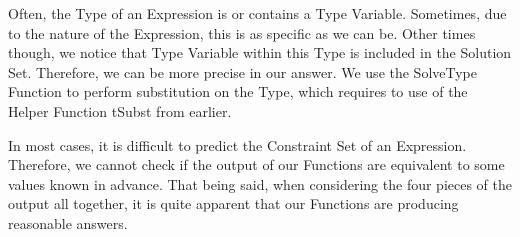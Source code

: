 \documentclass{article}
\begin{document}
Often, the Type of an Expression is or contains a Type Variable. Sometimes, due to the nature of the Expression, this is as specific as we can be. Other times though, we notice that Type Variable within this Type is included in the Solution Set. Therefore, we can be more precise in our answer. We use the SolveType Function to perform substitution on the Type, which requires to use of the Helper Function tSubst from earlier.

In most cases, it is difficult to predict the Constraint Set of an Expression. Therefore, we cannot check if the output of our Functions are equivalent to some values known in advance. That being said, when considering the four pieces of the output all together, it is quite apparent that our Functions are producing reasonable answers.
\end{document}
